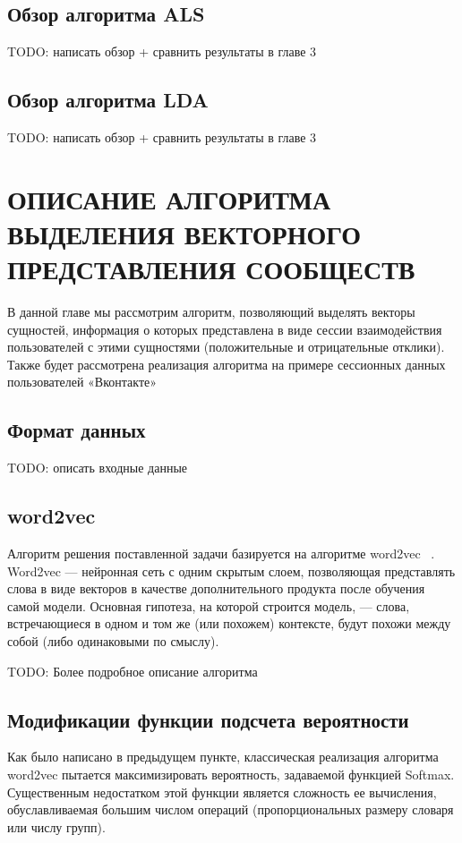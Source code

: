 \documentclass[times,specification,annotation]{itmo-student-thesis}
\begin{document}
\section{Обзор алгоритма ALS}

TODO: написать обзор + сравнить результаты в главе 3

\section{Обзор алгоритма LDA}

TODO: написать обзор + сравнить результаты в главе 3

\chapter{ОПИСАНИЕ АЛГОРИТМА ВЫДЕЛЕНИЯ ВЕКТОРНОГО ПРЕДСТАВЛЕНИЯ СООБЩЕСТВ}

В данной главе мы рассмотрим алгоритм, позволяющий выделять векторы
сущностей, информация о которых представлена в виде сессии взаимодействия
пользователей с этими сущностями (положительные и отрицательные отклики).
Также будет рассмотрена реализация алгоритма на примере сессионных данных
пользователей «Вконтакте»

\section{Формат данных}

TODO: описать входные данные

\section{word2vec}

Алгоритм решения поставленной задачи базируется на алгоритме
word2vec ~\cite{mikolov2013efficient}. Word2vec — нейронная сеть с одним скрытым слоем, позволяющая
представлять слова в виде векторов в качестве дополнительного продукта после
обучения самой модели. Основная гипотеза, на которой строится модель, — слова,
встречающиеся в одном и том же (или похожем) контексте, будут похожи между
собой (либо одинаковыми по смыслу).

TODO: Более подробное описание алгоритма

\section{Модификации функции подсчета вероятности}
Как было написано в предыдущем пункте, классическая реализация
алгоритма word2vec пытается максимизировать вероятность, задаваемой функцией
Softmax. Существенным недостатком этой функции является сложность ее
вычисления, обуславливаемая большим числом операций (пропорциональных
размеру словаря или числу групп).
\end{document}

